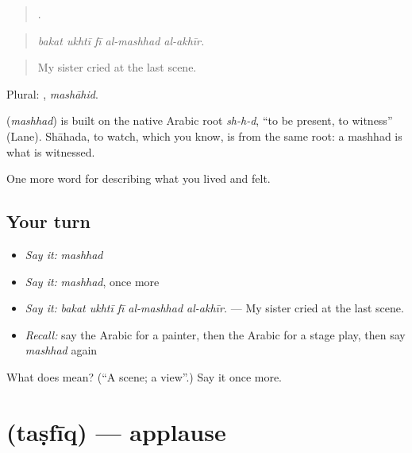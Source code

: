 \begin{quote}
    .
\end{quote}

\begin{quote}
\emph{bakat ukhtī fī al-mashhad al-akhīr.}
\end{quote}

\begin{quote}
My sister cried at the last scene.
\end{quote}

Plural: , \emph{mashāhid}.

\begin{cousinweb}
\textbf{} (\emph{mashhad}) is built on the native Arabic root \emph{sh-h-d}, \textquotedblleft{}to be present, to witness\textquotedblright{} (Lane). Shāhada, to watch, which you know, is from the same root: a mashhad is what is witnessed.
\end{cousinweb}

\begin{grammarlens}[title={What you've built}]
One more word for describing what you lived and felt.
\end{grammarlens}

\subsection*{Your turn}
\begin{itemize}
\raggedright
  \item \emph{Say it:} \emph{mashhad}
  \item \emph{Say it:} \emph{mashhad}, once more
  \item \emph{Say it:} \emph{bakat ukhtī fī al-mashhad al-akhīr.} — My sister cried at the last scene.
  \item \emph{Recall:} say the Arabic for a painter, then the Arabic for a stage play, then say \emph{mashhad} again
\end{itemize}

\begin{tcolorbox}[breakable,colback=teal!4,colframe=teal!35!black,title={Before you move on}]
What does  mean? (\textquotedblleft{}A scene; a view\textquotedblright{}.) Say it once more.
\end{tcolorbox}
\section[\texorpdfstring{\ar{تصفيق} (taṣfīq)}{تصفيق (taṣfīq)}]{ (taṣfīq) — applause}


